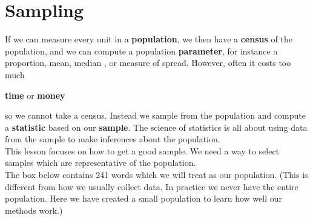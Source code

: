 ﻿\def\theTopic{Sampling }
\def\dayNum{3}

\section{ Sampling}

If we can measure every unit in a {\bf population}, we then have a
{\bf census} of the population, and  we can 
compute a population {\bf parameter}, for instance a proportion, mean,
median , or measure of spread. However, often it costs too much
\vspace{-.4cm}
\begin{center}
  {\large\bf  time}\hspace{2cm} or\hspace{2cm} {\bf\large money}
\vspace{-.4cm}
\end{center}
      so we cannot take a census.  Instead we  sample from the
      population and compute a {\bf statistic} based on our {\bf
      sample}. The science of statistics is all about using data from
    the sample to make inferences about the population.\\
  This lesson focuses on how to  get a good sample.  We need a way to select
  samples which are representative of the population.
  \\
  The box below contains 241 words which we will treat as our
  population. (This is different from how we usually collect data. In
  practice we never have the entire population. Here we have created a 
  small population to learn how well our methods work.)  
